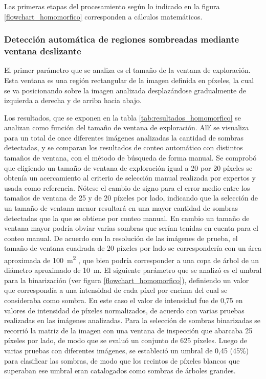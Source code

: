 Las primeras etapas del procesamiento según lo indicado en la figura \ref{flowchart_homomorfico} corresponden a cálculos matemáticos.
\subsubsection{Detección automática de regiones sombreadas mediante ventana deslizante} \label{resultados homo ventana}
El primer parámetro que se analiza es el tamaño de la ventana de exploración. Esta ventana es una región rectangular de la imagen definida en píxeles, la cual se va posicionando sobre la imagen analizada desplazándose gradualmente de izquierda a derecha y de arriba hacia abajo.

 Los resultados, que se exponen en la tabla \ref{tab:resultados_homomorfico} se analizan como función del tamaño de ventana de exploración.
Allí se visualiza para un total de once diferentes imágenes analizadas la cantidad de sombras detectadas, y se comparan los resultados de conteo automático con distintos tamaños de ventana, con el método de búsqueda de forma manual.
Se comprobó que eligiendo un tamaño de ventana de exploración igual a 20 por 20 píxeles se obtenía un acercamiento al criterio de selección manual realizada por expertos y usada como referencia.
Nótese el cambio de signo para el error medio entre los tamaños de ventana de 25 y de 20 píxeles por lado, indicando que la selección de un tamaño de ventana menor resultará en una mayor cantidad de sombras detectadas que la que se obtiene por conteo manual. En cambio un tamaño de ventana mayor podría obviar varias sombras que serían tenidas en cuenta para el conteo manual. De acuerdo con la resolución de las imágenes de prueba, el tamaño de ventana cuadrada de 20 píxeles por lado se correspondería con un área aproximada de \SI{100}{\metre\squared} , que bien podría corresponder a una copa de árbol de un diámetro aproximado de \SI{10}{\metre}.
El siguiente parámetro que se analizó es el umbral para la binarización (ver figura \ref{flowchart_homomorfico}), definiendo un valor que correspondía a una intensidad de cada píxel por encima del cual se consideraba como sombra. En este caso el valor de intensidad fue de 0,75 en valores de intensidad de píxeles normalizados, de acuerdo con varias pruebas realizadas en las imágenes analizadas.
Para la selección de sombras binarizadas se recorrió la matriz de la imagen con una ventana de inspección que abarcaba 25 píxeles por lado, de modo que se evaluó un conjunto de 625 píxeles. Luego de varias pruebas con diferentes imágenes, se estableció un umbral de 0,45 (45\%) para clasificar las sombras, de modo que los recintos de píxeles blancos que superaban ese umbral eran catalogados como sombras de árboles grandes.
